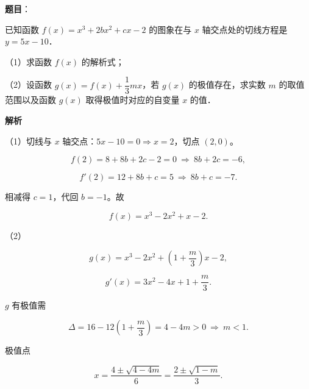 \begin{answer}

\textbf{题目}：

已知函数 $f(x)=x^3+2bx^2+cx-2$ 的图象在与 $x$ 轴交点处的切线方程是 $y=5x-10$．

（1）求函数 $f(x)$ 的解析式；

（2）设函数 $g(x)=f(x)+\dfrac13mx$，若 $g(x)$ 的极值存在，求实数 $m$ 的取值范围以及函数 $g(x)$ 取得极值时对应的自变量 $x$ 的值．

\textbf{解析}

（1）切线与 $x$ 轴交点：$5x-10=0\Rightarrow x=2$，切点 $(2,0)$。

\nopagebreak[4]
\[f(2)=8+8b+2c-2=0\ \Longrightarrow\ 8b+2c=-6,\]

\nopagebreak[4]
\[f'(2)=12+8b+c=5\ \Longrightarrow\ 8b+c=-7 .\]

相减得 $c=1$，代回 $b=-1$。故

\nopagebreak[4]
\[f(x)=x^3-2x^2+x-2 .\]

（2）

\nopagebreak[4]
\[g(x)=x^3-2x^2+\left(1+\frac m3\right)x-2,\]

\nopagebreak[4]
\[g'(x)=3x^2-4x+1+\frac m3 .\]

$g$ 有极值需

\nopagebreak[4]
\[\Delta=16-12\left(1+\frac m3\right)=4-4m>0\ \Longrightarrow\ m<1 .\]

极值点

\nopagebreak[4]
\[x=\frac{4\pm\sqrt{4-4m}}{6}=\frac{2\pm\sqrt{1-m}}{3}.\]


\end{answer}
